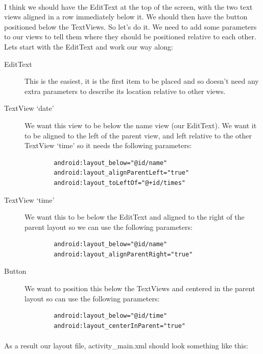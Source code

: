 \paragraph{} I think we should have the EditText at the top of the screen, with the two text views aligned in a row immediately below it. We should then have the button positioned below the TextViews. So let's do it. We need to add some parameters to our views to tell them where they should be positioned relative to each other. Lets start with the EditText and work our way along:

\begin{description}
\item[EditText] This is the easiest, it is the first item to be placed and so doesn't need any extra parameters to describe its location relative to other views.
\item[TextView `date'] We want this view to be below the name view (our EditText). We want it to be aligned to the left of the parent view, and left relative to the other TextView `time' so it needs the following parameters:
    \begin{lstlisting}
        android:layout_below="@id/name"
        android:layout_alignParentLeft="true"
        android:layout_toLeftOf="@+id/times"
    \end{lstlisting}
\item[TextView `time'] We want this to be below the EditText and aligned to the right of the parent layout so we can use the following parameters:
    \begin{lstlisting}
        android:layout_below="@id/name"
        android:layout_alignParentRight="true"
    \end{lstlisting}
\item[Button] We want to position this below the TextViews and centered in the parent layout so can use the following parameters:
    \begin{lstlisting}
        android:layout_below="@id/time"
        android:layout_centerInParent="true"
    \end{lstlisting}
\end{description}

\paragraph{} As a result our layout file, activity\_main.xml should look something like this:

